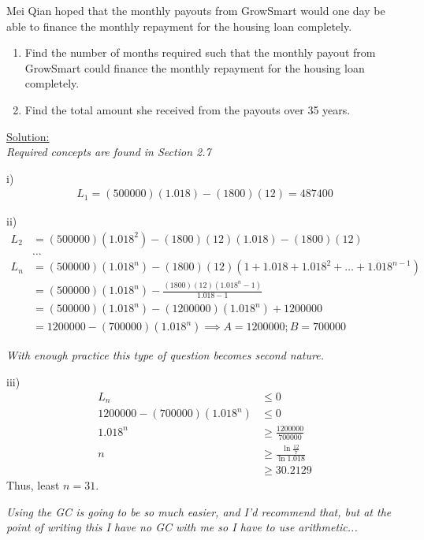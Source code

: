 \documentclass[12pt, a4paper, titlepage]{article}
\begin{document}
Mei Qian hoped that the monthly payouts from GrowSmart would one day be able to finance the monthly repayment for the housing loan completely.
\begin{enumerate}[resume, label=(\roman*)]
    \item Find the number of months required such that the monthly payout from GrowSmart could finance the monthly repayment for the housing loan completely.
    \item Find the total amount she received from the payouts over 35 years.
\end{enumerate}

\begin{flushright}
\end{flushright}

\underline{Solution:} \\
\emph{Required concepts are found in Section 2.7}

i)
\begin{align*}
    L_1 = (500000)(1.018) - (1800)(12) = 487400
\end{align*}

ii)
\begin{align*}
    L_2 &= (500000)(1.018^2) - (1800)(12)(1.018) - (1800)(12) \\
    &\dots \\
    L_n &= (500000)(1.018^n) - (1800)(12)(1 + 1.018 + 1.018^2 + \dots + 1.018^{n - 1}) \\
    &= (500000)(1.018^n) - \frac{(1800)(12)(1.018^n - 1)}{1.018 - 1} \\
    &= (500000)(1.018^n) - (1200000)(1.018^n) + 1200000 \\
    &= 1200000 - (700000)(1.018^n) \implies A = 1200000; B = 700000
\end{align*}

\emph{With enough practice this type of question becomes second nature.}

iii)
\begin{align*}
    L_n &\leq 0 \\
    1200000 - (700000)(1.018^n) &\leq 0 \\
    1.018^n &\ge \frac{1200000}{700000} \\
    n &\ge \frac{\ln \frac{12}{7}}{\ln 1.018} \\
    &\ge 30.2129
\end{align*}
Thus, least $n = 31$.

\emph{Using the GC is going to be so much easier, and I'd recommend that, but at the point of writing this I have no GC with me so I have to use arithmetic...}
\end{document}
